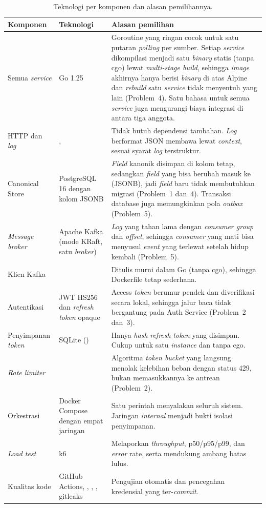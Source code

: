 \begin{table}[H]
\centering
\small
\begin{tabularx}{\textwidth}{@{}L{3.3cm}L{3.8cm}Y@{}}
\toprule
\textbf{Komponen} & \textbf{Teknologi} & \textbf{Alasan pemilihan}\\
\midrule
Semua \emph{service} & Go 1.25 & Goroutine yang ringan cocok untuk satu putaran \emph{polling} per sumber. Setiap \emph{service} dikompilasi menjadi satu \emph{binary} statis (tanpa cgo) lewat \emph{multi-stage build}, sehingga \emph{image} akhirnya hanya berisi \emph{binary} di atas Alpine dan \emph{rebuild} satu \emph{service} tidak menyentuh yang lain (Problem~4). Satu bahasa untuk semua \emph{service} juga mengurangi biaya integrasi di antara tiga anggota.\\
HTTP dan \emph{log} & ,  & Tidak butuh dependensi tambahan. \emph{Log} berformat JSON membawa  lewat \emph{context}, sesuai syarat \emph{log} terstruktur.\\
Canonical Store & PostgreSQL 16 dengan kolom JSONB & \emph{Field} kanonik disimpan di kolom tetap, sedangkan \emph{field} yang bisa berubah masuk ke  (JSONB), jadi \emph{field} baru tidak membutuhkan migrasi (Problem~1 dan~4). Transaksi database juga memungkinkan pola \emph{outbox} (Problem~5).\\
\emph{Message broker} & Apache Kafka (mode KRaft, satu \emph{broker}) & \emph{Log} yang tahan lama dengan \emph{consumer group} dan \emph{offset}, sehingga \emph{consumer} yang mati bisa menyusul \emph{event} yang terlewat setelah hidup kembali (Problem~5).\\
Klien Kafka &  & Ditulis murni dalam Go (tanpa cgo), sehingga Dockerfile tetap sederhana.\\
Autentikasi & JWT HS256 dan \emph{refresh} \emph{token} opaque & Access \emph{token} berumur pendek dan diverifikasi secara lokal, sehingga jalur baca tidak bergantung pada Auth Service (Problem~2 dan~3).\\
Penyimpanan \emph{token} & SQLite () & Hanya \emph{hash} \emph{refresh} \emph{token} yang disimpan. Cukup untuk satu \emph{instance} dan tanpa cgo.\\
\emph{Rate limiter} &  & Algoritma \emph{token bucket} yang langsung menolak kelebihan beban dengan status 429, bukan memasukkannya ke antrean (Problem~2).\\
Orkestrasi & Docker Compose dengan empat jaringan & Satu perintah menyalakan seluruh sistem. Jaringan \emph{internal} menjadi bukti isolasi penyimpanan.\\
\emph{Load test} & k6 & Melaporkan \emph{throughput}, p50/p95/p99, dan \emph{error} rate, serta mendukung ambang batas lulus.\\
Kualitas kode & GitHub Actions, , , , gitleaks & Pengujian otomatis dan pencegahan kredensial yang ter-\emph{commit}.\\
\bottomrule
\end{tabularx}
\caption{Teknologi per komponen dan alasan pemilihannya.}
\end{table}

